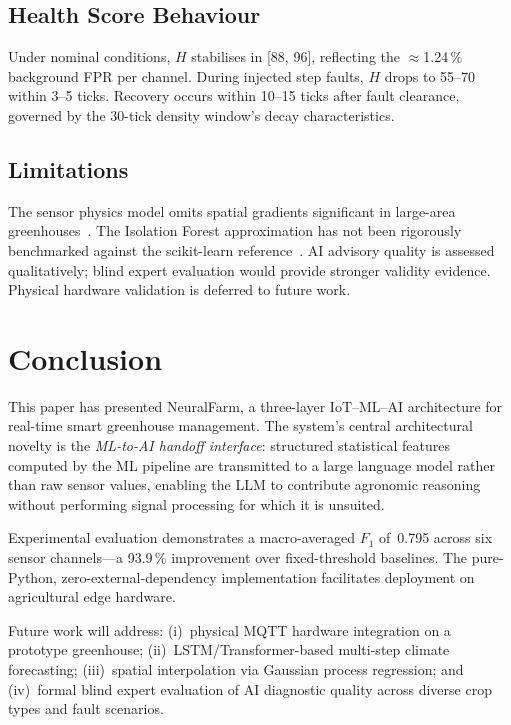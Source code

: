 \documentclass[journal,10pt,twocolumn]{IEEEtran}
\begin{document}
\subsection{Health Score Behaviour}

Under nominal conditions, $H$ stabilises in [88, 96], reflecting the
$\approx$1.24\,\% background FPR per channel.
During injected step faults, $H$ drops to 55--70 within 3--5 ticks.
Recovery occurs within 10--15 ticks after fault clearance,
governed by the 30-tick density window's decay characteristics.

\subsection{Limitations}

The sensor physics model omits spatial gradients significant in
large-area greenhouses~\cite{Campen2003}.
The Isolation Forest approximation has not been rigorously benchmarked
against the scikit-learn reference~\cite{Pedregosa2011}.
AI advisory quality is assessed qualitatively; blind expert evaluation
would provide stronger validity evidence.
Physical hardware validation is deferred to future work.

\section{Conclusion}
\label{sec:conclusion}

This paper has presented NeuralFarm, a three-layer IoT--ML--AI
architecture for real-time smart greenhouse management.
The system's central architectural novelty is the \emph{ML-to-AI
handoff interface}: structured statistical features computed by the ML
pipeline are transmitted to a large language model rather than raw
sensor values, enabling the LLM to contribute agronomic reasoning
without performing signal processing for which it is unsuited.

Experimental evaluation demonstrates a macro-averaged $F_1$ of~0.795
across six sensor channels---a 93.9\,\% improvement over fixed-threshold
baselines.
The pure-Python, zero-external-dependency implementation facilitates
deployment on agricultural edge hardware.

Future work will address: (i)~physical MQTT hardware integration on a
prototype greenhouse; (ii)~LSTM/Transformer-based multi-step climate
forecasting; (iii)~spatial interpolation via Gaussian process regression;
and (iv)~formal blind expert evaluation of AI diagnostic quality across
diverse crop types and fault scenarios.
\end{document}
